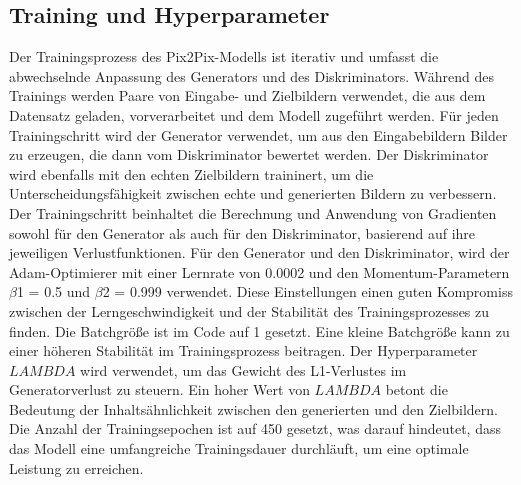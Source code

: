 \subsection{Training und Hyperparameter}
Der Trainingsprozess des Pix2Pix-Modells ist iterativ und umfasst die abwechselnde Anpassung des Generators und des Diskriminators. Während des Trainings werden Paare von Eingabe- und Zielbildern verwendet, die aus dem Datensatz geladen, vorverarbeitet und dem Modell zugeführt werden. Für jeden Trainingschritt wird der Generator verwendet, um aus den Eingabebildern Bilder zu erzeugen, die dann vom Diskriminator bewertet werden. Der Diskriminator wird ebenfalls mit den echten Zielbildern traininert, um die Unterscheidungsfähigkeit zwischen echte und generierten Bildern zu verbessern. Der Trainingschritt beinhaltet die Berechnung und Anwendung von Gradienten sowohl für den Generator als auch für den Diskriminator, basierend auf ihre jeweiligen Verlustfunktionen.
\newline
Für den Generator und den Diskriminator, wird der Adam-Optimierer mit einer Lernrate von 0.0002 und den Momentum-Parametern $\beta$1 = 0.5 und $\beta$2 = 0.999 verwendet. Diese Einstellungen einen guten Kompromiss zwischen der Lerngeschwindigkeit und der Stabilität des Trainingsprozesses zu finden. Die Batchgröße ist im Code auf 1 gesetzt. Eine kleine Batchgröße kann zu einer höheren Stabilität im Trainingsprozess beitragen. Der Hyperparameter $LAMBDA$ wird verwendet, um das Gewicht des L1-Verlustes im Generatorverlust zu steuern. Ein hoher Wert von $LAMBDA$ betont die Bedeutung der Inhaltsähnlichkeit zwischen den generierten und den Zielbildern. Die Anzahl der Trainingsepochen ist auf 450 gesetzt, was darauf hindeutet, dass das Modell eine umfangreiche Trainingsdauer durchläuft, um eine optimale Leistung zu erreichen.




